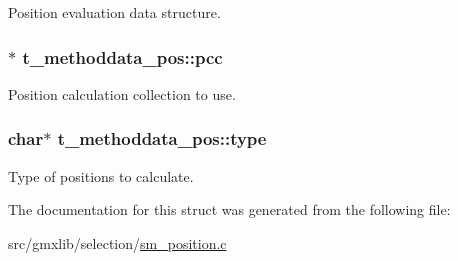\-Position evaluation data structure. \hypertarget{structt__methoddata__pos_a5cb44a8570633aea89067bc354e691c9}{
\subsubsection[{pcc}]{$\ast$ {\bf t\-\_\-methoddata\-\_\-pos\-::pcc}}}\label{structt__methoddata__pos_a5cb44a8570633aea89067bc354e691c9}
\-Position calculation collection to use. \hypertarget{structt__methoddata__pos_aa30ade9b0148d6623342537aad8128df}{
\subsubsection[{type}]{\setlength{\rightskip}{0pt plus 5cm}char$\ast$ {\bf t\-\_\-methoddata\-\_\-pos\-::type}}}\label{structt__methoddata__pos_aa30ade9b0148d6623342537aad8128df}
\-Type of positions to calculate. 

\-The documentation for this struct was generated from the following file\-:\begin{DoxyCompactItemize}
\item 
src/gmxlib/selection/\hyperlink{sm__position_8c}{sm\-\_\-position.\-c}\end{DoxyCompactItemize}
